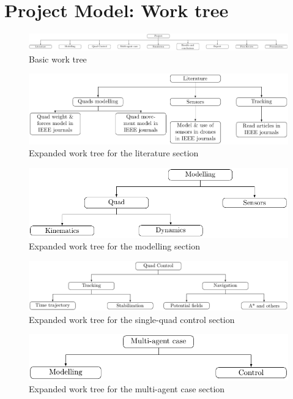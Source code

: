 \documentclass{article}
\begin{document}
	\section{Project Model: Work tree}
		\begin{figure}[H]
				\centering
				\includegraphics[width=1.15\linewidth]{Workplan_work_tree/basic_work_tree_diagram}
				\caption{Basic work tree}
		\end{figure}
		\begin{figure}[H]
			\centering
			\includegraphics[width=.8\linewidth]{Workplan_work_tree/literature_work_tree_diagram}
			\caption{Expanded work tree for the literature section}
		\end{figure}
		\begin{figure}[H]
			\centering
			\includegraphics[width=.8\linewidth]{Workplan_work_tree/modelling_work_tree_diagram}
			\caption{Expanded work tree for the modelling section}
		\end{figure}
		\begin{figure}[H]
			\centering
			\includegraphics[width=.8\linewidth]{Workplan_work_tree/control_work_tree_diagram}
			\caption{Expanded work tree for the single-quad control section}
		\end{figure}
		\begin{figure}[H]
			\centering
			\includegraphics[width=.8\linewidth]{Workplan_work_tree/multiagent_work_tree_diagram}
			\caption{Expanded work tree for the multi-agent case section}
		\end{figure}
\end{document}
